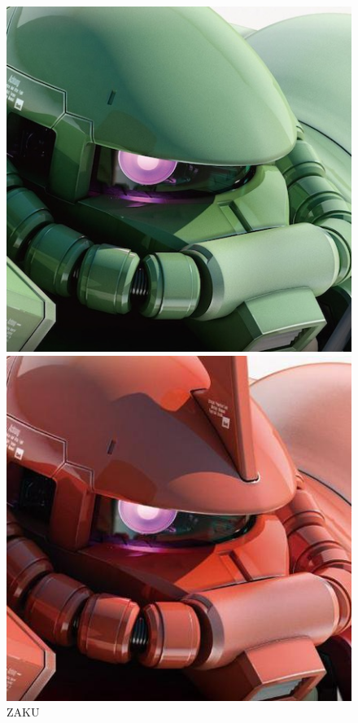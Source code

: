 \begin{figure}[h]
  \begin{minipage}[b]{.5\textwidth}
    \centering
    \includegraphics[width=.9\textwidth]{./contents/3_latex_knowhow/figure/ms06f.jpg}
  \end{minipage}%
  \begin{minipage}[b]{.5\textwidth}
    \centering
    \includegraphics[width=.9\textwidth]{./contents/3_latex_knowhow/figure/ms06s.jpg}
  \end{minipage}
  \caption{ZAKU}
\end{figure}


